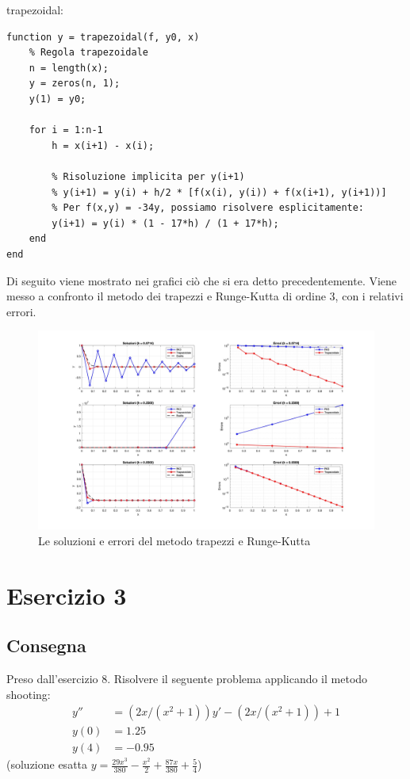 \documentclass[11pt]{article}
\begin{document}
trapezoidal:
\begin{lstlisting}
function y = trapezoidal(f, y0, x)
    % Regola trapezoidale
    n = length(x);
    y = zeros(n, 1);
    y(1) = y0;
    
    for i = 1:n-1
        h = x(i+1) - x(i);
        
        % Risoluzione implicita per y(i+1)
        % y(i+1) = y(i) + h/2 * [f(x(i), y(i)) + f(x(i+1), y(i+1))]
        % Per f(x,y) = -34y, possiamo risolvere esplicitamente:
        y(i+1) = y(i) * (1 - 17*h) / (1 + 17*h);
    end
end
\end{lstlisting}
Di seguito viene mostrato nei grafici ciò che si era detto precedentemente. Viene messo a confronto il metodo dei trapezzi e Runge-Kutta di ordine 3, con i relativi errori.
\begin{figure}[H]
  \centering
  \includegraphics[width=1.2\textwidth]{images/fig5.jpg} 
  \caption{Le soluzioni e errori del metodo trapezzi e Runge-Kutta}
  \label{fig:funzione}
\end{figure}
\section{Esercizio 3}
\subsection{Consegna}
Preso dall'esercizio 8. Risolvere il seguente problema applicando il metodo shooting: 
\begin{align}
	y'' &= (2x/( x^2 +1 ))y'-(2x/( x^2 +1 ))+1\\
y(0)&=1.25 \\
y(4)&=-0.95 
\end{align}
(soluzione esatta $y = \frac{29x^3}{380} - \frac{x^2}{2} + \frac{87x}{380} + \frac{5}{4}$)
\end{document}
